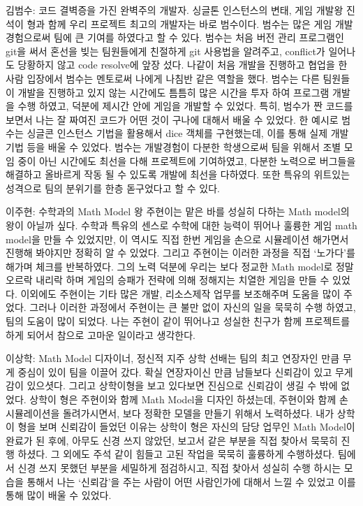 \documentclass[10pt,oneside,a4paper,titlepage]{article}
\begin{document}
김범수: 코드 결벽증을 가진 완벽주의 개발자. 싱글톤 인스턴스의 변태, 게임 개발왕
	진석이 형과 함께 우리 프로젝트 최고의 개발자는 바로 범수이다. 범수는 많은 게임 개발 경험으로써 팀에 큰 기여를 하였다고 할 수 있다. 범수는 처음 버전 관리 프로그램인 git을 써서 혼선을 빚는 팀원들에게 친절하게 git 사용법을 알려주고, conflict가 일어나도 당황하지 않고 code resolve에 앞장 섰다. 나같이 처음 개발을 진행하고 협업을 한 사람 입장에서 범수는 멘토로써 나에게 나침반 같은 역할을 했다. 범수는 다른 팀원들이 개발을 진행하고 있지 않는 시간에도 틈틈히 많은 시간을 투자 하여 프로그램 개발을 수행 하였고, 덕분에 제시간 안에 게임을 개발할 수 있었다. 특히, 범수가 짠 코드를 보면서 나는 잘 짜여진 코드가 어떤 것이 구나에 대해서 배울 수 있었다. 한 예시로 범수는 싱글콘 인스턴스 기법을 활용해서 dice 객체를 구현했는데, 이를 통해 실제 개발 기법 등을 배울 수 있었다.
	범수는 개발경험이 다분한 학생으로써 팀을 위해서 조별 모임 중이 아닌 시간에도 최선을 다해 프로젝트에 기여하였고, 다분한 노력으로 버그들을 해결하고 올바르게 작동 될 수 있도록 개발에 최선을 다하였다. 또한 특유의 위트있는 성격으로 팀의 분위기를 한층 돋구었다고 할 수 있다.


이주현: 수학과의 Math Model 왕 
	주현이는 맡은 바를 성실히 다하는 Math model의 왕이 아닐까 싶다. 수학과 특유의 센스로 수학에 대한 능력이 뛰어나 훌륭한 게임 math model을 만들 수 있었지만, 이 역시도 직접 한번 게임을 손으로 시뮬레이션 해가면서 진행해 봐야지만 정확히 알 수 있었다. 그리고 주현이는 이러한 과정을 직접 ‘노가다’를 해가며 체크를 반복하였다. 그의 노력 덕분에 우리는 보다 정교한 Math model로 정말 오르락 내리락 하며 게임의 승패가 전략에 의해 정해지는 치열한 게임을 만들 수 있었다. 
	이외에도 주현이는 기타 많은 개발, 리소스제작 업무를 보조해주며 도움을 많이 주었다. 그러나 이러한 과정에서 주현이는 큰 불만 없이 자신의 일을 묵묵히 수행 하였고, 팀의 도움이 많이 되었다. 나는 주현이 같이 뛰어나고 성실한 친구가 함께 프로젝트를 하게 되어서 참으로 고마운 일이라고 생각한다.

이상학: Math Model 디자이너, 정신적 지주
	상학 선배는 팀의 최고 연장자인 만큼 무게 중심이 있이 팀을 이끌어 갔다. 확실 연장자이신 만큼 남들보다 신뢰감이 있고 무게감이 있으셧다. 그리고 상학이형을 보고 있다보면 진심으로 신뢰감이 생길 수 밖에 없었다. 상학이 형은 주현이와 함께 Math Model을 디자인 하셨는데, 주현이와 함께 손 시뮬레이션을 돌려가시면서, 보다 정확한 모델을 만들기 위해서 노력하셨다. 내가 상학이 형을 보며 신뢰감이 들었던 이유는 상학이 형은 자신의 담당 업무인 Math Model이 완료가 된 후에, 아무도 신경 쓰지 않았던, 보고서 같은 부분을 직접 찾아서 묵묵히 진행 하셨다. 그 외에도 주석 같이 힘들고 고된 작업을 묵묵히 훌륭하게 수행하셨다. 
	팀에서 신경 쓰지 못했던 부분을 세밀하게 점검하시고, 직접 찾아서 성실히 수행 하시는 모습을 통해서 나는 ‘신뢰감’을 주는 사람이 어떤 사람인가에 대해서 느낄 수 있었고 이를 통해 많이 배울 수 있었다. 
\end{document}

